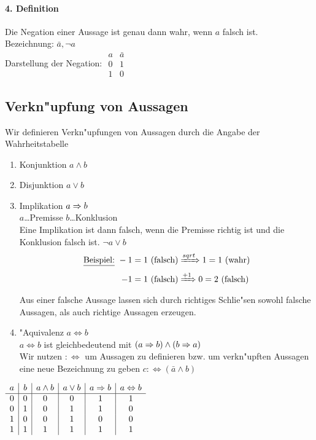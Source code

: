 \paragraph{4. Definition} Die Negation einer Aussage ist genau dann wahr, wenn $a$ falsch ist.\\
Bezeichnung: $\bar a, \neg a$\\
Darstellung der Negation:  $\begin{array}{l|l}
	a & \bar a\\\hline
	0 & 1\\
	1 & 0
\end{array}$

\subsection{Verkn"upfung von Aussagen}

Wir definieren Verkn"upfungen von Aussagen durch die Angabe der Wahrheitstabelle
\begin{enumerate}[label=\alph*)]
	\item Konjunktion $a\land b$
	\item Disjunktion $a\lor b$
	\item Implikation $a\Rightarrow b$\\
	$a$\dots Premisse \quad $b$\dots Konklusion\\
	Eine Implikation ist dann falsch, wenn die Premisse richtig ist und die Konklusion falsch ist. $\neg a\lor b$\\
	\begin{align*}
		\text{\underline{Beispiel:} } -1=1\text{ (falsch)}&\xRightarrow{sqrt}1=1\text{ (wahr)}\\
		-1=1\text{ (falsch)}&\xRightarrow{+1}0=2\text{ (falsch)}
	\end{align*}
	Aus einer falsche Aussage lassen sich durch richtiges Schlie"sen sowohl falsche Aussagen, als auch richtige Aussagen erzeugen.
	\item "Aquivalenz $a\Leftrightarrow b$\\
	$a\Leftrightarrow b$ ist gleichbedeutend mit $(a\Rightarrow b)\land(b\Rightarrow a)$\\
	Wir nutzen $:\Leftrightarrow$ um Aussagen zu definieren bzw. um verkn"upften Aussagen eine neue Bezeichnung zu geben $c:\Leftrightarrow(\bar a\land b)$
\end{enumerate}
$\begin{array}{c|c|c|c|c|c}
	a & b & a\land b & a\lor b & a\Rightarrow b & a\Leftrightarrow b \\\hline
	0 & 0 & 0 & 0 & 1 & 1 \\
	0 & 1 & 0 & 1 & 1 & 0 \\
	1 & 0 & 0 & 1 & 0 & 0 \\
	1 & 1 & 1 & 1 & 1 & 1
\end{array}$


